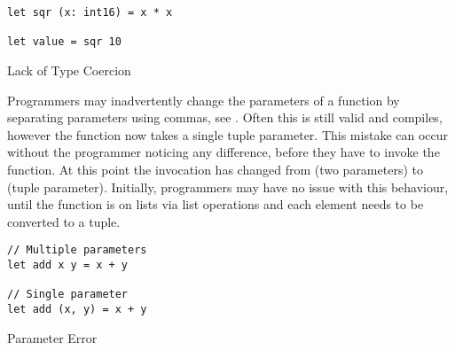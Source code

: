 \begin{listing}[H]
\begin{verbatim}
let sqr (x: int16) = x * x

let value = sqr 10
\end{verbatim}
\caption{Lack of Type Coercion}
\label{lst:coer-lack}
\end{listing}

Programmers may inadvertently change the parameters of a function by separating parameters using commas, see . Often this is still valid \fs and compiles, however the function now takes a single tuple parameter. This mistake can occur without the programmer noticing any difference, before they have to invoke the function. At this point the invocation has changed from (two parameters) to (tuple parameter). Initially, programmers may have no issue with this behaviour, until the function is on lists via list operations and each element needs to be converted to a tuple.

\begin{listing}[H]
\begin{verbatim}
// Multiple parameters
let add x y = x + y

// Single parameter
let add (x, y) = x + y
\end{verbatim}
\caption{Parameter Error}
\label{lst:para-err}
\end{listing}
